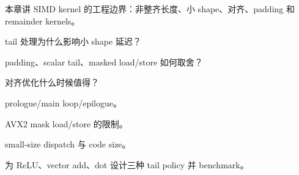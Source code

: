 {本章讲 SIMD kernel 的工程边界：非整齐长度、小 shape、对齐、padding 和 remainder kernels。}
{\item tail 处理为什么影响小 shape 延迟？
\item padding、scalar tail、masked load/store 如何取舍？
\item 对齐优化什么时候值得？}
{\item prologue/main loop/epilogue。
\item AVX2 mask load/store 的限制。
\item small-size dispatch 与 code size。}
{为 ReLU、vector add、dot 设计三种 tail policy 并 benchmark。}
